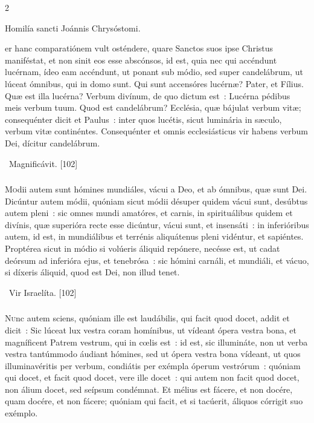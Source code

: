\documentclass[9pt,twoside]{extarticle}
\begin{document}
\begin{multicols}{2}
{{\begin{center}Homilía sancti Joánnis Chrysóstomi.\\
\end{center}
er hanc comparatiónem vult osténdere, quare Sanctos suos ipse Christus maniféstat, et non sinit eos esse abscónsos, id est, quia nec qui accéndunt lucérnam, ídeo eam accéndunt, ut ponant sub módio, sed super candelábrum, ut lúceat ómnibus, qui in domo sunt. Qui sunt accensóres lucérnæ? Pater, et Fílius. Quæ est illa lucérna? Verbum divínum, de quo dictum est~: Lucérna pédibus meis verbum tuum. Quod est candelábrum? Ecclésia, quæ bájulat verbum vitæ; consequénter dicit et Paulus~: inter quos lucétis, sicut luminária in sæculo, verbum vitæ continéntes. Consequénter et omnis ecclesiásticus vir habens verbum Dei, dícitur candelábrum.

\begin{tightlist}{}
\item {}~Magnificávit. [102]
\end{tightlist}

\subsubsection*{\center {}}
\lettrine{M}odii autem sunt hómines mundiáles, vácui a Deo, et ab ómnibus, quæ sunt Dei. Dicúntur autem módii, quóniam sicut módii désuper quidem vácui sunt, desúbtus autem pleni~: sic omnes mundi amatóres, et carnis, in spirituálibus quidem et divínis, quæ superióra recte esse dicúntur, vácui sunt, et insensáti~: in inferióribus autem, id est, in mundiálibus et terrénis aliquátenus pleni vidéntur, et sapiéntes. Proptérea sicut in módio si volúeris áliquid repónere, necésse est, ut cadat deórsum ad inferióra ejus, et tenebrósa~: sic hómini carnáli, et mundiáli, et vácuo, si díxeris áliquid, quod est Dei, non illud tenet.

\begin{tightlist}{}
\item {}~Vir Israelíta. [102]
\end{tightlist}

\subsubsection*{\center {}}
\lettrine{N}unc autem sciens, quóniam ille est laudábilis, qui facit quod docet, addit et dicit~: Sic lúceat lux vestra coram homínibus, ut vídeant ópera vestra bona, et magníficent Patrem vestrum, qui in cœlis est~: id est, sic illumináte, non ut verba vestra tantúmmodo áudiant hómines, sed ut ópera vestra bona vídeant, ut quos illuminavéritis per verbum, condiátis per exémpla óperum vestrórum~: quóniam qui docet, et facit quod docet, vere ille docet~: qui autem non facit quod docet, non álium docet, sed seípsum condémnat. Et mélius est fácere, et non docére, quam docére, et non fácere; quóniam qui facit, et si tacúerit, áliquos córrigit suo exémplo.

}}
\end{multicols}
\end{document}
